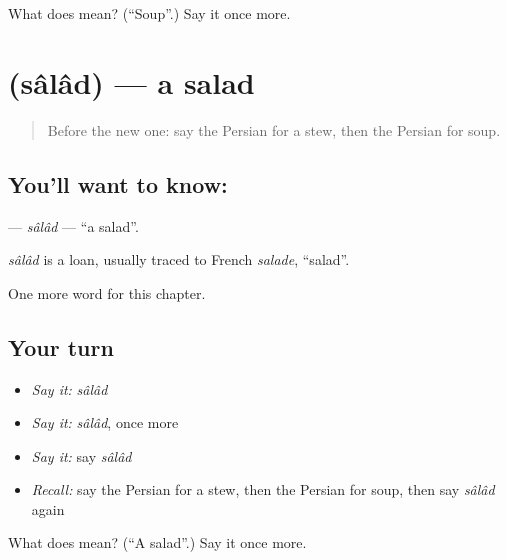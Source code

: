 \begin{tcolorbox}[breakable,colback=teal!4,colframe=teal!35!black,title={Before you move on}]
What does  mean? (\textquotedblleft{}Soup\textquotedblright{}.) Say it once more.
\end{tcolorbox}
\section[\texorpdfstring{\fa{سالاد} (sâlâd)}{سالاد (sâlâd)}]{ (sâlâd) — a salad}

\label{lesson:FA-C98-salad}



\begin{quote}
Before the new one: say the Persian for a stew, then the Persian for soup.
\end{quote}

\subsection*{You'll want to know: }
\textbf{} — \emph{sâlâd} — \textquotedblleft{}a salad\textquotedblright{}.

\begin{cousinweb}
\emph{sâlâd} is a loan, usually traced to French \emph{salade}, \textquotedblleft{}salad\textquotedblright{}.
\end{cousinweb}

\begin{grammarlens}[title={What you've built}]
One more word for this chapter.
\end{grammarlens}

\subsection*{Your turn}
\begin{itemize}
\raggedright
  \item \emph{Say it:} \emph{sâlâd}
  \item \emph{Say it:} \emph{sâlâd}, once more
  \item \emph{Say it:} say \emph{sâlâd}
  \item \emph{Recall:} say the Persian for a stew, then the Persian for soup, then say \emph{sâlâd} again
\end{itemize}

\begin{tcolorbox}[breakable,colback=teal!4,colframe=teal!35!black,title={Before you move on}]
What does  mean? (\textquotedblleft{}A salad\textquotedblright{}.) Say it once more.
\end{tcolorbox}
